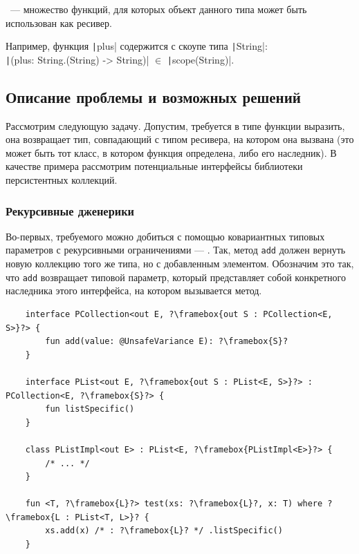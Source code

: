 \begin{definition}
    \label{def:type-scope}
    ~--- множество функций, для которых объект данного типа может быть использован как ресивер.
\end{definition}

Например, функция \texttt|plus| содержится с скоупе типа \texttt|String|: \\\texttt|(plus: String.(String) -> String)| $\in$ \texttt|scope(String)|.


\subsection{Описание проблемы и возможных решений}

Рассмотрим следующую задачу.
Допустим, требуется в типе функции выразить, она возвращает тип, совпадающий с типом ресивера, на котором она вызвана (это может быть тот класс, в котором функция определена, либо его наследник).
В качестве примера рассмотрим потенциальные интерфейсы библиотеки персистентных коллекций.

\subsubsection{Рекурсивные дженерики} \label{subsubsec:recursive-generics}

Во-первых, требуемого можно добиться с помощью ковариантных типовых параметров с рекурсивными ограничениями --- .
Так, метод \texttt{add} должен вернуть новую коллекцию того же типа, но с добавленным элементом.
Обозначим это так, что \texttt{add} возвращает типовой параметр, который представляет собой конкретного наследника этого интерфейса, на котором вызывается метод.

\begin{verbatim}
    interface PCollection<out E, ?\framebox{out S : PCollection<E, S>}?> {
        fun add(value: @UnsafeVariance E): ?\framebox{S}?
    }

    interface PList<out E, ?\framebox{out S : PList<E, S>}?> : PCollection<E, ?\framebox{S}?> {
        fun listSpecific()
    }

    class PListImpl<out E> : PList<E, ?\framebox{PListImpl<E>}?> {
        /* ... */
    }

    fun <T, ?\framebox{L}?> test(xs: ?\framebox{L}?, x: T) where ?\framebox{L : PList<T, L>}? {
        xs.add(x) /* : ?\framebox{L}? */ .listSpecific()
    }
\end{verbatim}

